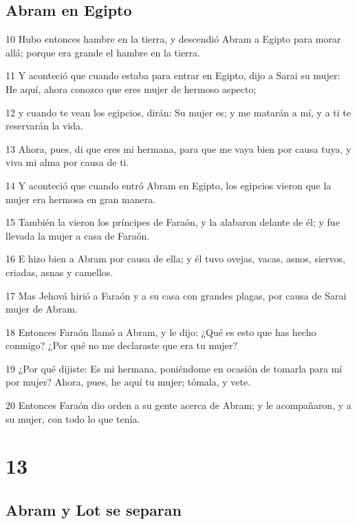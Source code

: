 \section*{Abram en Egipto}

\par 10 Hubo entonces hambre en la tierra, y descendió Abram a Egipto para morar allá; porque era grande el hambre en la tierra.
\par 11 Y aconteció que cuando estaba para entrar en Egipto, dijo a Sarai su mujer: He aquí, ahora conozco que eres mujer de hermoso aspecto;
\par 12 y cuando te vean los egipcios, dirán: Su mujer es; y me matarán a mí, y a ti te reservarán la vida.
\par 13 Ahora, pues, di que eres mi hermana, para que me vaya bien por causa tuya, y viva mi alma por causa de ti.
\par 14 Y aconteció que cuando entró Abram en Egipto, los egipcios vieron que la mujer era hermosa en gran manera.
\par 15 También la vieron los príncipes de Faraón, y la alabaron delante de él; y fue llevada la mujer a casa de Faraón.
\par 16 E hizo bien a Abram por causa de ella; y él tuvo ovejas, vacas, asnos, siervos, criadas, asnas y camellos.
\par 17 Mas Jehová hirió a Faraón y a su casa con grandes plagas, por causa de Sarai mujer de Abram.
\par 18 Entonces Faraón llamó a Abram, y le dijo: ¿Qué es esto que has hecho conmigo? ¿Por qué no me declaraste que era tu mujer?
\par 19 ¿Por qué dijiste: Es mi hermana, poniéndome en ocasión de tomarla para mí por mujer? Ahora, pues, he aquí tu mujer; tómala, y vete.
\par 20 Entonces Faraón dio orden a su gente acerca de Abram; y le acompañaron, y a su mujer, con todo lo que tenía.

\chapter{13}

\section*{Abram y Lot se separan}

